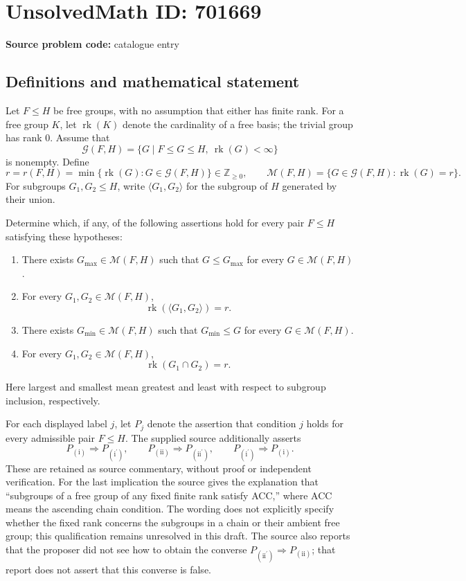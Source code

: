 \documentclass[11pt]{article}
\newcommand{\Z}{\mathbb{Z}}
\begin{document}
\section*{UnsolvedMath ID: 701669}
\textbf{Source problem code:} catalogue entry
\subsection{Definitions and mathematical statement}
Let \(F\leq H\) be free groups, with no assumption that either has finite rank. For a free group \(K\), let \(\operatorname{rk}(K)\) denote the cardinality of a free basis; the trivial group has rank \(0\). Assume that
\[
\mathcal G(F,H)=\{G\mid F\leq G\leq H,\ \operatorname{rk}(G)<\infty\}
\]
is nonempty. Define
\[
r=r(F,H)=\min\{\operatorname{rk}(G):G\in\mathcal G(F,H)\}\in\Z_{\geq0},
\qquad
\mathcal M(F,H)=\{G\in\mathcal G(F,H):\operatorname{rk}(G)=r\}.
\]
For subgroups \(G_1,G_2\leq H\), write \(\langle G_1,G_2\rangle\) for the subgroup of \(H\) generated by their union.

Determine which, if any, of the following assertions hold for every pair \(F\leq H\) satisfying these hypotheses:
\begin{enumerate}
\item[(i)] There exists \(G_{\max}\in\mathcal M(F,H)\) such that \(G\leq G_{\max}\) for every \(G\in\mathcal M(F,H)\).
\item[(i\(^{\prime}\))] For every \(G_1,G_2\in\mathcal M(F,H)\),
\[
\operatorname{rk}(\langle G_1,G_2\rangle)=r.
\]
\item[(ii)] There exists \(G_{\min}\in\mathcal M(F,H)\) such that \(G_{\min}\leq G\) for every \(G\in\mathcal M(F,H)\).
\item[(ii\(^{\prime}\))] For every \(G_1,G_2\in\mathcal M(F,H)\),
\[
\operatorname{rk}(G_1\cap G_2)=r.
\]
\end{enumerate}
Here largest and smallest mean greatest and least with respect to subgroup inclusion, respectively.

For each displayed label \(j\), let \(P_j\) denote the assertion that condition \(j\) holds for every admissible pair \(F\leq H\). The supplied source additionally asserts
\[
P_{\mathrm{(i)}}\Longrightarrow P_{\mathrm{(i^{\prime})}},\qquad
P_{\mathrm{(ii)}}\Longrightarrow P_{\mathrm{(ii^{\prime})}},\qquad
P_{\mathrm{(i^{\prime})}}\Longrightarrow P_{\mathrm{(i)}}.
\]
These are retained as source commentary, without proof or independent verification. For the last implication the source gives the explanation that ``subgroups of a free group of any fixed finite rank satisfy ACC,'' where ACC means the ascending chain condition. The wording does not explicitly specify whether the fixed rank concerns the subgroups in a chain or their ambient free group; this qualification remains unresolved in this draft. The source also reports that the proposer did not see how to obtain the converse \(P_{\mathrm{(ii^{\prime})}}\Longrightarrow P_{\mathrm{(ii)}}\); that report does not assert that this converse is false.
\end{document}
